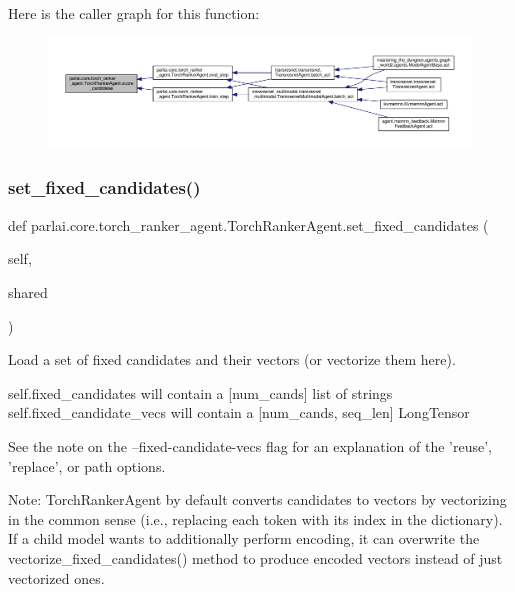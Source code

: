 Here is the caller graph for this function\+:
\nopagebreak
\begin{figure}[H]
\begin{center}
\leavevmode
\includegraphics[width=350pt]{classparlai_1_1core_1_1torch__ranker__agent_1_1TorchRankerAgent_a65d5726a4e2098212298bc2cdf13e70f_icgraph}
\end{center}
\end{figure}
\mbox{\label{classparlai_1_1core_1_1torch__ranker__agent_1_1TorchRankerAgent_a9039757596f98b45b6676b16589883a3}} 
\subsubsection{\texorpdfstring{set\+\_\+fixed\+\_\+candidates()}{set\_fixed\_candidates()}}
{\footnotesize\ttfamily def parlai.\+core.\+torch\+\_\+ranker\+\_\+agent.\+Torch\+Ranker\+Agent.\+set\+\_\+fixed\+\_\+candidates (\begin{DoxyParamCaption}\item[{}]{self,  }\item[{}]{shared }\end{DoxyParamCaption})}

\begin{DoxyVerb}Load a set of fixed candidates and their vectors (or vectorize them here).

self.fixed_candidates will contain a [num_cands] list of strings
self.fixed_candidate_vecs will contain a [num_cands, seq_len] LongTensor

See the note on the --fixed-candidate-vecs flag for an explanation of the
'reuse', 'replace', or path options.

Note: TorchRankerAgent by default converts candidates to vectors by vectorizing
in the common sense (i.e., replacing each token with its index in the
dictionary). If a child model wants to additionally perform encoding, it can
overwrite the vectorize_fixed_candidates() method to produce encoded vectors
instead of just vectorized ones.
\end{DoxyVerb}
 

